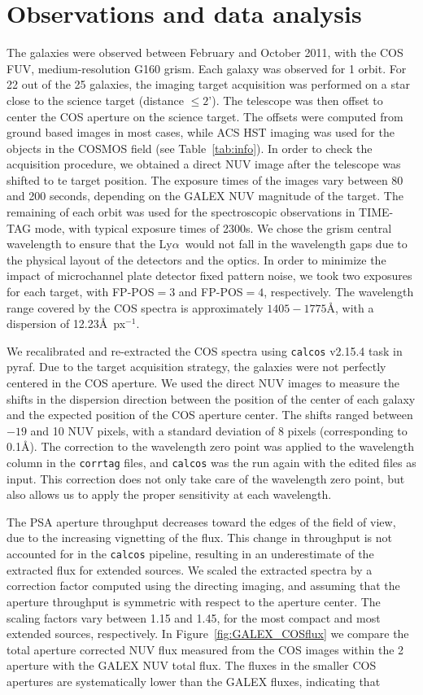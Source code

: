 \documentclass[manuscript]{emulateapj}
\newcommand{\lya}{Ly$\alpha$}
\begin{document}
\section{Observations and data analysis}
\label{sec:data}
The galaxies were observed between February and October 2011, with the
COS FUV, medium-resolution G160 grism. Each galaxy was observed for 1
orbit. For 22 out of the 25 galaxies, the imaging target acquisition
was performed on a star close to the science target (distance $\le
2$'). The telescope was then offset to center the COS aperture on the
science target. The offsets were computed from ground based images in
most cases, while ACS HST imaging was used for the objects in the
COSMOS field (see Table~\ref{tab:info}). In order to check the
acquisition procedure, we obtained a direct NUV image after the
telescope was shifted to te target position.  The exposure times of
the images vary between 80 and 200 seconds, depending on the GALEX NUV
magnitude of the target. The remaining of each orbit was used for the
spectroscopic observations in TIME-TAG mode, with typical exposure
times of 2300s.  We chose the grism central wavelength to ensure that
the \lya\ would not fall in the wavelength gaps due to the physical
layout of the detectors and the optics. In order to minimize the
impact of microchannel plate detector fixed pattern noise, we took two
exposures for each target, with FP-POS$=3$ and FP-POS$=4$,
respectively. The wavelength range covered by the COS spectra is
approximately $1405-1775$\AA, with a dispersion of 12.23\AA\
px$^{-1}$. 
                        
We recalibrated and re-extracted the COS spectra using {\tt calcos}
v2.15.4 task in pyraf. Due to the target acquisition strategy, the
galaxies were not perfectly centered in the COS aperture. We used the
direct NUV images to measure the shifts in the dispersion direction
between the position of the center of each galaxy and the expected
position of the COS aperture center. The shifts ranged between $-19$
and 10 NUV pixels, with a standard deviation of 8 pixels
(corresponding to 0.1\AA). The correction to the wavelength zero
point was applied to the wavelength column in the {\tt corrtag} files,
and {\tt calcos} was the run again with the edited files as
input. This correction does not only take care of the wavelength zero
point, but also allows us to apply the proper sensitivity at each
wavelength.

The PSA aperture throughput decreases toward the edges of the field of
view, due to the increasing vignetting of the flux. This change in
throughput is not accounted for in the {\tt calcos} pipeline,
resulting in an underestimate of the extracted flux for extended
sources. We scaled the extracted spectra by a correction factor
computed using the directing imaging, and assuming that the aperture
throughput is symmetric with respect to the aperture center. The
scaling factors vary between 1.15 and 1.45, for the most compact and
most extended sources, respectively. In Figure~\ref{fig:GALEX_COSflux}
we compare the total aperture corrected NUV flux measured from the COS
images within the 2\farcs5 aperture with the GALEX NUV total flux. The
fluxes in the smaller COS apertures are systematically lower than the
GALEX fluxes, indicating that 
\end{document}
